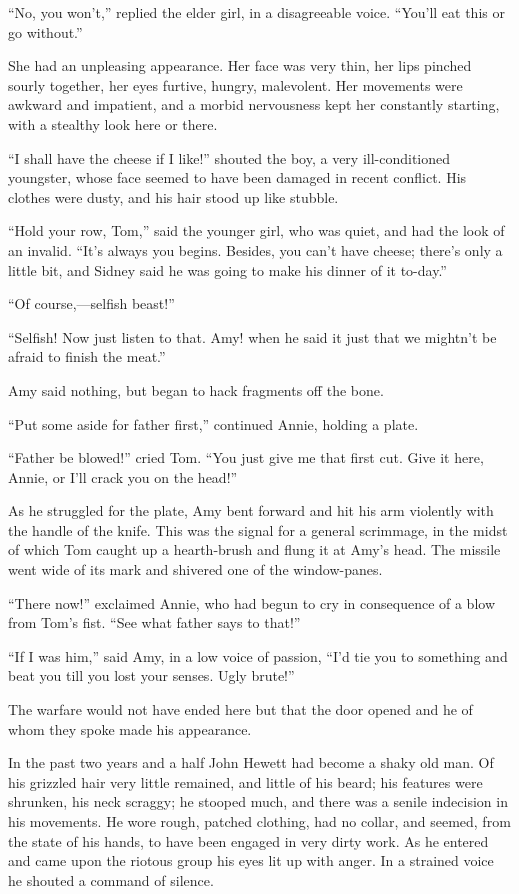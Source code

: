 ``No, you won't,'' replied the elder girl, in a disagreeable voice.
``You'll eat this or go without.''

She had an unpleasing appearance. Her face was very thin, her lips
pinched sourly together, her eyes furtive, hungry, malevolent. Her
movements were awkward and impatient, and a morbid nervousness kept her
constantly starting, with a stealthy look here or there.

``I shall have the cheese if I like!'' shouted the boy, a very
ill-conditioned youngster, whose face seemed to have been damaged in
recent conflict. His clothes were dusty, and his hair stood up like
stubble.

``Hold your row, Tom,'' said the younger {}girl, who was quiet, and had
the look of an invalid. ``It's always you begins. Besides, you can't
have cheese; there's only a little bit, and Sidney said he was going to
make his dinner of it to-day.''

``Of course,---selfish beast!''

``Selfish! Now just listen to that. Amy! when he said it just that we
mightn't be afraid to finish the meat.''

Amy said nothing, but began to hack fragments off the bone.

``Put some aside for father first,'' continued Annie, holding a plate.

``Father be blowed!'' cried Tom. ``You just give me that first cut. Give
it here, Annie, or I'll crack you on the head!''

As he struggled for the plate, Amy bent forward and hit his arm
violently with the handle of the knife. This was the signal for a
general scrimmage, in the midst of which Tom caught up a hearth-brush
and flung it at Amy's head. The missile went wide of its mark and
shivered one of the window-panes.

``There now!'' exclaimed Annie, who had begun to cry in consequence of a
blow from Tom's fist. ``See what father says to that!''

{}``If I was him,'' said Amy, in a low voice of passion, ``I'd tie you
to something and beat you till you lost your senses. Ugly brute!''

The warfare would not have ended here but that the door opened and he of
whom they spoke made his appearance.

In the past two years and a half John Hewett had become a shaky old man.
Of his grizzled hair very little remained, and little of his beard; his
features were shrunken, his neck scraggy; he stooped much, and there was
a senile indecision in his movements. He wore rough, patched clothing,
had no collar, and seemed, from the state of his hands, to have been
engaged in very dirty work. As he entered and came upon the riotous
group his eyes lit up with anger. In a strained voice he shouted a
command of silence.

